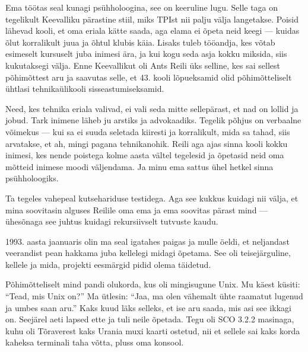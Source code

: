 
Ema töötas seal kunagi psühholoogina, see on keeruline lugu. Selle taga on 
tegelikult Keevalliku pärastine stiil, miks TPIst nii palju välja 
langetakse. Poisid lähevad kooli, et oma eriala kätte saada, aga elama ei õpeta neid keegi --- kuidas õlut korralikult 
juua ja õhtul klubis käia. Lisaks tuleb tööandja, kes võtab esimeselt 
kursuselt juba inimesi ära, ja kui kogu seda asja kokku miksida, siis kukutaksegi välja. 
Enne Keevallikut oli Ants Reili üks selline, kes 
sai sellest põhimõttest aru ja saavutas selle, et 43. kooli lõpueksamid olid põhimõtteliselt ühtlasi 
tehnikaülikooli sisseastumiseksamid. 

Need, kes tehnika eriala valivad, ei vali seda 
mitte sellepärast, et nad on lollid ja jobud. Tark inimene läheb ju arstiks ja 
advokaadiks. Tegelik põhjus on verbaalne võimekus --- 
kui sa ei suuda seletada kiiresti ja korralikult, mida sa tahad, siis 
arvatakse, et ah, mingi pagana tehnikanohik. Reili aga
ajas sinna kooli kokku inimesi, kes nende poistega kolme aasta vältel 
tegelesid ja õpetasid neid oma mõtteid inimese moodi väljendama. Ja minu ema sattus ühel hetkel sinna psühholoogiks. 


Ta tegeles vahepeal kutsehariduse testidega. Aga 
see kukkus kuidagi nii välja, et mina soovitasin alguses 
Reilile oma ema ja ema soovitas pärast mind --- 
ühesõnaga see juhtus kuidagi rekursiivselt tutvuste kaudu. 

1993. aasta jaanuaris olin ma seal igatahes paigas ja mulle öeldi, et neljandast 
veerandist pean hakkama juba kellelegi midagi 
õpetama. See oli teisejärguline, kellele ja mida,
projekti eesmärgid pidid olema täidetud.

Põhimõtteliselt mind pandi olukorda, kus oli mingisugune Unix. Mu käest küsiti: \enquote{Tead, mis Unix on?} Ma ütlesin: \enquote{Jaa, ma olen 
vähemalt ühte raamatut lugenud ja umbes saan aru.} Kaks 
kuud läks selleks, et ise aru saada, mis asi see ikkagi on. Seejärel aeti lapsed 
ette ja tuli neile õpetada. Tegu oli SCO 3.2.2 masinaga, kuhu oli 
Tõraverest kaks Urania muxi kaarti ostetud, nii et 
sellele sai kaks korda kaheksa terminali taha võtta, 
pluss oma konsool. 

